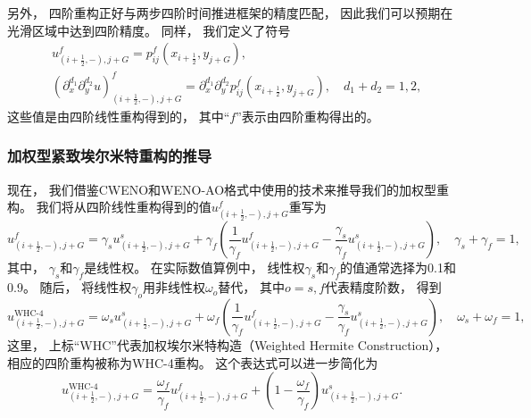 另外，
四阶重构正好与两步四阶时间推进框架的精度匹配，
因此我们可以预期在光滑区域中达到四阶精度。
同样，
我们定义了符号
\begin{align}
   & u_{(i+\frac{1}{2},-), j+G}^{{f}}= p^{{f}}_{ij}(x_{i+\frac{1}{2}}, y_{j+G}),                                                                                                                  \\
   & \left({\partial_{x}^{d_1}}{\partial_{y}^{d_2}}u\right)_{(i+\frac{1}{2},-), j+G}^{{f}}= {\partial_{x}^{d_1}}{\partial_{y}^{d_2}}p_{ij}^{{f}}(x_{i+\frac{1}{2}}, y_{j+G}), \quad d_1+d_2=1,2,
\end{align}
这些值是由四阶线性重构得到的，
其中“${{f}}$”表示由四阶重构得出的。

\subsubsection{加权型紧致埃尔米特重构的推导}

现在，
我们借鉴CWENO和WENO-AO格式中使用的技术来推导我们的加权型重构。
我们将从四阶线性重构得到的值$u_{(i+\frac{1}{2},-), j+G}^{{f}}$重写为
\begin{equation}
  u_{(i+\frac{1}{2},-), j+G}^{{f}}= \gamma_{{s}}u_{(i+\frac{1}{2},-), j+G}^{{s}}+ \gamma_{{f}}\left(\frac{1}{\gamma_{{f}}}u_{(i+\frac{1}{2},-), j+G}^{{f}}-\frac{\gamma_{{s}}}{\gamma_{{f}}}u_{(i+\frac{1}{2},-), j+G}^{{s}}\right), \quad \gamma_{{s}}+ \gamma_{{f}}=1,
\end{equation}
其中，
$\gamma_{{s}}$和$\gamma_{{f}}$是线性权。
在实际数值算例中，
线性权$\gamma_{{s}}$和$\gamma_{{f}}$的值通常选择为0.1和0.9。
随后，
将线性权$\gamma_{{o}}$用非线性权$\omega_{{o}}$替代，
其中${{o}}={{s}}, {{f}}$代表精度阶数，
得到
\begin{equation}
  u_{(i+\frac{1}{2},-), j+G}^{\text{WHC-4}}= \omega_{{s}}u_{(i+\frac{1}{2},-), j+G}^{{s}}+ \omega_{{f}}\left(\frac{1}{\gamma_{{f}}}u_{(i+\frac{1}{2},-), j+G}^{{f}}-\frac{\gamma_{{s}}}{\gamma_{{f}}}u_{(i+\frac{1}{2},-), j+G}^{{s}}\right), \quad \omega_{{s}}+\omega_{{f}}=1,
\end{equation}
这里，
上标“WHC”代表加权埃尔米特构造（Weighted Hermite Construction），
相应的四阶重构被称为WHC-4重构。
这个表达式可以进一步简化为
\begin{equation}
  \label{eq:WHC4}
  u_{(i+\frac{1}{2},-), j+G}^{\text{WHC-4}}= \frac{\omega_{{f}}}{\gamma_{{f}}}u_{(i+\frac{1}{2},-), j+G}^{{f}}+ \left(1-\frac{\omega_{{f}}}{\gamma_{{f}}}\right)u_{(i+\frac{1}{2},-), j+G}^{{s}}.
\end{equation}

